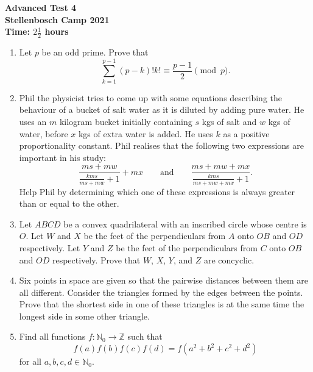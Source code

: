 \documentclass{article}
\begin{document}
\thispagestyle{empty}

\begin{center}
  \textbf{\Large Advanced Test 4}
  \\ \vspace{1em}
  \textbf{\large Stellenbosch Camp 2021}
  \\ \vspace{1em}
  \textbf{\large Time: $2\frac{1}{2}$ hours}
\end{center}

\vfill

\begin{enumerate}[itemsep=\fill]

\item %
Let $p$ be an odd prime. Prove that
\[
	\sum_{k=1}^{p-1} (p-k)!k! \equiv \frac{p-1}{2} \pmod{p}.
\]


\item %
Phil the physicist tries to come up with some equations describing the behaviour of a bucket of salt water as it is diluted by adding pure water. He uses an $m$ kilogram bucket initially containing $s$ kgs of salt and $w$ kgs of water, before $x$ kgs of extra water is added. He uses $k$ as a positive proportionality constant. Phil realises that the following two expressions are important in his study: 
$$\frac{ms+mw}{\frac{kms}{ms+mw}+1} + mx \qquad\text{and}\qquad \frac{ms+mw+mx}{\frac{kms}{ms+mw+mx}+1}.$$
Help Phil by determining which one of these expressions is always greater than or equal to the other.


\item %
Let $ABCD$ be a convex quadrilateral with an inscribed circle whose centre is $O$. Let $W$ and $X$ be the feet of the perpendiculars from $A$ onto $OB$ and $OD$ respectively. Let $Y$ and $Z$ be the feet of the perpendiculars from $C$ onto $OB$ and $OD$ respectively. Prove that $W$, $X$, $Y$, and $Z$ are concyclic.


\item %
Six points in space are given so that the pairwise distances between them are all different. Consider the triangles formed by the edges between the points. Prove that the shortest side in one of these triangles is at the same time the longest side in some other triangle.


\item %
Find all functions $f : \mathbb{N}_0 \to \mathbb{Z}$ such that
\[
  f(a) f(b) f(c) f(d) = f\left(a^2 + b^2 + c^2 + d^2\right)
\]
for all $a, b, c, d \in \mathbb{N}_0$.

\end{enumerate}
\end{document}

